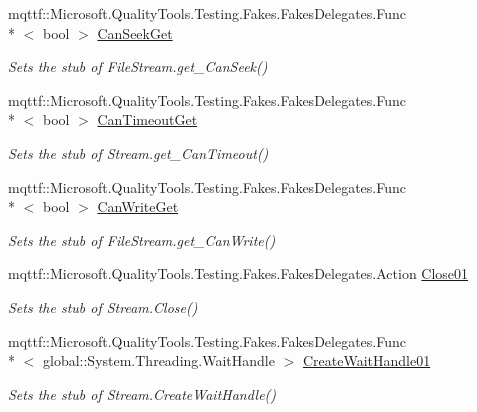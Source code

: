 \begin{DoxyCompactItemize}
mqttf\-::\-Microsoft.\-Quality\-Tools.\-Testing.\-Fakes.\-Fakes\-Delegates.\-Func\\*
$<$ bool $>$ \hyperlink{class_system_1_1_i_o_1_1_fakes_1_1_stub_file_stream_aebeadf077e1935c15aea9d023419c407}{Can\-Seek\-Get}
\begin{DoxyCompactList}\small\item\em Sets the stub of File\-Stream.\-get\-\_\-\-Can\-Seek()\end{DoxyCompactList}\item 
mqttf\-::\-Microsoft.\-Quality\-Tools.\-Testing.\-Fakes.\-Fakes\-Delegates.\-Func\\*
$<$ bool $>$ \hyperlink{class_system_1_1_i_o_1_1_fakes_1_1_stub_file_stream_a826ec75c9565d9761a8cc049b0c961b9}{Can\-Timeout\-Get}
\begin{DoxyCompactList}\small\item\em Sets the stub of Stream.\-get\-\_\-\-Can\-Timeout()\end{DoxyCompactList}\item 
mqttf\-::\-Microsoft.\-Quality\-Tools.\-Testing.\-Fakes.\-Fakes\-Delegates.\-Func\\*
$<$ bool $>$ \hyperlink{class_system_1_1_i_o_1_1_fakes_1_1_stub_file_stream_aad22ce903be8f603ff454d65f5b36068}{Can\-Write\-Get}
\begin{DoxyCompactList}\small\item\em Sets the stub of File\-Stream.\-get\-\_\-\-Can\-Write()\end{DoxyCompactList}\item 
mqttf\-::\-Microsoft.\-Quality\-Tools.\-Testing.\-Fakes.\-Fakes\-Delegates.\-Action \hyperlink{class_system_1_1_i_o_1_1_fakes_1_1_stub_file_stream_a7925905bfe3f2617be5d62fc9e1d3ed7}{Close01}
\begin{DoxyCompactList}\small\item\em Sets the stub of Stream.\-Close()\end{DoxyCompactList}\item 
mqttf\-::\-Microsoft.\-Quality\-Tools.\-Testing.\-Fakes.\-Fakes\-Delegates.\-Func\\*
$<$ global\-::\-System.\-Threading.\-Wait\-Handle $>$ \hyperlink{class_system_1_1_i_o_1_1_fakes_1_1_stub_file_stream_a0dc9fa2814677c9e0f91474d6a300327}{Create\-Wait\-Handle01}
\begin{DoxyCompactList}\small\item\em Sets the stub of Stream.\-Create\-Wait\-Handle()\end{DoxyCompactList}\item 

\end{DoxyCompactItemize}
